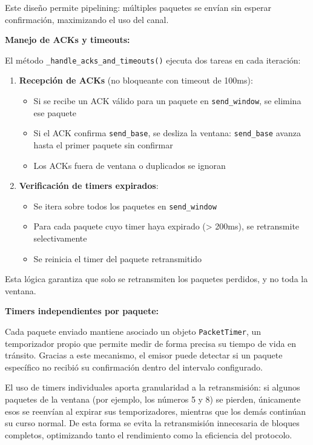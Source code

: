 Este diseño permite pipelining: múltiples paquetes se envían sin esperar confirmación, maximizando el uso del canal.

\textbf{Manejo de ACKs y timeouts:}

El método \texttt{\_handle\_acks\_and\_timeouts()} ejecuta dos tareas en cada iteración:

\begin{enumerate}
    \item \textbf{Recepción de ACKs} (no bloqueante con timeout de 100ms):
    \begin{itemize}
        \item Si se recibe un ACK válido para un paquete en \texttt{send\_window}, se elimina ese paquete
        \item Si el ACK confirma \texttt{send\_base}, se desliza la ventana: \texttt{send\_base} avanza hasta el primer paquete sin confirmar
        \item Los ACKs fuera de ventana o duplicados se ignoran
    \end{itemize}
    
    \item \textbf{Verificación de timers expirados}:
    \begin{itemize}
        \item Se itera sobre todos los paquetes en \texttt{send\_window}
        \item Para cada paquete cuyo timer haya expirado (> 200ms), se retransmite selectivamente
        \item Se reinicia el timer del paquete retransmitido
    \end{itemize}
\end{enumerate}

Esta lógica garantiza que solo se retransmiten los paquetes perdidos, y no toda la ventana.

\textbf{Timers independientes por paquete:}

Cada paquete enviado mantiene asociado un objeto \texttt{PacketTimer}, un temporizador propio que permite medir de forma precisa su tiempo de vida en tránsito. Gracias a este mecanismo, el emisor puede detectar si un paquete específico no recibió su confirmación dentro del intervalo configurado. 

El uso de timers individuales aporta granularidad a la retransmisión: si algunos paquetes de la ventana (por ejemplo, los números 5 y 8) se pierden, únicamente esos se reenvían al expirar sus temporizadores, mientras que los demás continúan su curso normal. De esta forma se evita la retransmisión innecesaria de bloques completos, optimizando tanto el rendimiento como la eficiencia del protocolo.

